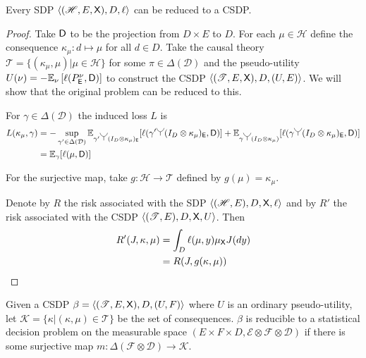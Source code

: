 \begin{theorem}\label{th:sdp_to_CSDP}
Every SDP $\langle (\mathscr{H},E,\mathsf{X}),D,\ell\rangle$ can be reduced to a CSDP.
\end{theorem}
\begin{proof}
Take $\mathsf{D}$ to be the projection from $D\times E$ to $D$. For each $\mu\in \mathscr{H}$ define the consequence $\kappa_\mu:d\mapsto \mu$ for all $d\in D$. Take the causal theory $\mathscr{T}=\{(\kappa_\mu,\mu)|\mu\in \mathscr{H}\}$ for some $\pi\in \Delta(\mathcal{D})$ and the pseudo-utility $U(\nu) = -\mathbb{E}_\nu \left[\ell(P^\nu_{\mathsf{E}},\mathsf{D})\right]$ to construct the CSDP $\langle (\mathscr{T},E,\mathsf{X}),D,(U,E)\rangle$. We will show that the original problem can be reduced to this.

For $\gamma\in \Delta(\mathcal{D})$ the induced loss $L$ is
\begin{align}
    L(\kappa_\mu,\gamma) &= -\sup_{\gamma'\in \Delta(\mathcal{D})} \mathbb{E}_{\gamma' \splitter{0.15}(I_D\otimes \kappa_\mu)_{\RV{E}}}[\ell(\gamma'\splitter{0.15}(I_D\otimes \kappa_\mu)_{\RV{E}},\RV{D})] + \mathbb{E}_{\gamma \splitter{0.15}(I_D\otimes \kappa_\mu)}[\ell(\gamma \splitter{0.15}(I_D\otimes \kappa_\mu)_{\RV{E}},\RV{D})]\\
                     &= \mathbb{E}_{\gamma}[\ell(\mu,\RV{D})]
\end{align}

For the surjective map, take $g:\mathscr{H}\to \mathscr{T}$ defined by $g(\mu)=\kappa_\mu$.

Denote by $R$ the risk associated with the SDP $\langle (\mathscr{H},E),D,\mathsf{X},\ell\rangle$ and by $R'$ the risk associated with the CSDP $\langle (\mathscr{T},E),D,\mathsf{X},U\rangle$. Then
\begin{align}
    R'(J,\kappa,\mu) &= \int_D \ell(\mu, y) \mu_{\mathsf{X}} J(dy)\\
                   &=R(J,g(\kappa,\mu))
\end{align}
\end{proof}

\begin{theorem}\label{th:red_CSDP}
Given a CSDP $\beta=\langle (\mathscr{T},E,\mathsf{X}),D,(U,F)\rangle$ where $U$ is an ordinary pseudo-utility, let $\mathscr{K}=\{\kappa|(\kappa,\mu)\in \mathscr{T}\}$ be the set of consequences. $\beta$ is reducible to a statistical decision problem on the measurable space $(E\times F\times D,\mathcal{E}\otimes \mathcal{F}\otimes \mathcal{D})$ if there is some surjective map $m:\Delta(\mathcal{F}\otimes\mathcal{D})\to \mathscr{K}$.
\end{theorem}

